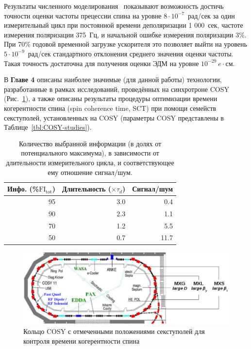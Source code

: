 Результаты численного моделирования~\cite{Aksentev:Stats} показывают 
возможность достичь точности оценки частоты прецессии спина 
на уровне ${8\cdot 10^{-7}}$~рад/сек за один измерительный цикл при постоянной времени деполяризации 
1 000~сек, частоте измерения поляризации 375~Гц, и начальной ошибке измерения поляризации 3\%. 
При 70\%  годовой временной загрузке ускорителя это позволяет выйти на уровень 
${5\cdot 10^{-9}}$~рад/сек стандартного отклонения среднего значения оценки частоты. 
Такая точность достаточна для получения оценки ЭДМ на уровне $10^{-29}~e\cdot$см.

В \textbf{Главе 4} описаны наиболее значимые (для данной работы) технологии, 
разработанные в рамках исследований, проведённых на синхротроне COSY (Рис.~\ref{fig:COSY_Ring}), 
а также описаны результаты процедуры оптимизации времени когерентности спина (spin coherence time, SCT) 
при помощи семейств секступолей, установленных на COSY
(параметры COSY  представлены в Таблице~\ref{tbl:COSY-studies}).

\begin{table}[H]\captionsetup{width=.75\linewidth}
	\caption{Количество выбранной информации (в долях от потенциального максимума), 
		в зависимости от длительности измерительного цикла, 
		и соответствующее ему отношение сигнал/шум.\label{tbl:FItot}}
	\centering
	\begin{tabular}{rrr}
		\toprule
		Инфо. (\%$\mathrm{FI_{tot}}$) & Длительность ($\times\tau_d$) & Сигнал/шум  \\
		\midrule
		95            & 3.0                     & 0.4         \\
		90            & 2.3                     & 1.1         \\
		70            & 1.2                     & 5.5         \\
		50            & 0.7                     & 11.7        \\
		\bottomrule
	\end{tabular}
\end{table}



\begin{figure}[H]\centering
	\includegraphics[width=\linewidth]{images/chapter4/COSY-sextupoles}
	\caption{Кольцо COSY с отмеченными положениями секступолей для контроля времени когерентности спина~\cite{Guidoboni:STORI14}\label{fig:COSY_Ring}}
\end{figure}



